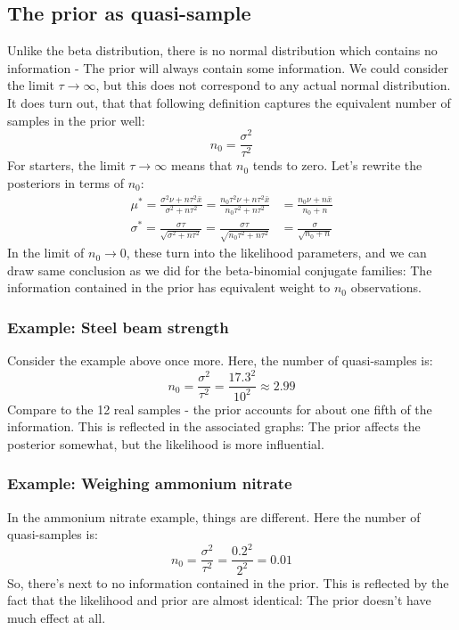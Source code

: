 \documentclass[12pt, a4paper]{article}
\begin{document}
\subsection{The prior as quasi-sample}
Unlike the beta distribution, there is no normal distribution which contains no information - The prior will always contain some information. We could consider the limit $\tau\rightarrow\infty$, but this does not correspond to any actual normal distribution. It does turn out, that that following definition captures the equivalent number of samples in the prior well:
\begin{equation}
n_0=\frac{\sigma^2}{\tau^2}
\end{equation}
For starters, the limit $\tau\rightarrow\infty$ means that $n_0$ tends to zero. Let's rewrite the posteriors in terms of $n_0$:
\begin{align}
\mu^*=\frac{\sigma^2\nu+n\tau^2\bar{x}}{\sigma^2+n\tau^2}=\frac{n_0\tau^2\nu+n\tau^2\bar{x}}{n_0\tau^2+n\tau^2}&=\frac{n_0\nu+n\bar{x}}{n_0+n}\\
\sigma^*=\frac{\sigma\tau}{\sqrt{\sigma^2+n\tau^2}}=\frac{\sigma\tau}{\sqrt{n_0\tau^2+n\tau^2}}&=\frac{\sigma}{\sqrt{n_0+n}}
\end{align}
In the limit of $n_0\rightarrow 0$, these turn into the likelihood parameters, and we can draw same conclusion as we did for the beta-binomial conjugate families: The information contained in the prior has equivalent weight to $n_0$ observations.

\subsubsection{Example: Steel beam strength}
Consider the example above once more. Here, the number of quasi-samples is:
\begin{equation}
n_0=\frac{\sigma^2}{\tau^2}=\frac{17.3^2}{10^2}\approx 2.99
\end{equation}
Compare to the 12 real samples - the prior accounts for about one fifth of the information. This is reflected in the associated graphs: The prior affects the posterior somewhat, but the likelihood is more influential.

\subsubsection{Example: Weighing ammonium nitrate}
In the ammonium nitrate example, things are different. Here the number of quasi-samples is:
\begin{equation}
n_0=\frac{\sigma^2}{\tau^2}=\frac{0.2^2}{2^2}=0.01
\end{equation}
So, there's next to no information contained in the prior. This is reflected by the fact that the likelihood and prior are almost identical: The prior doesn't have much effect at all.
\end{document}
